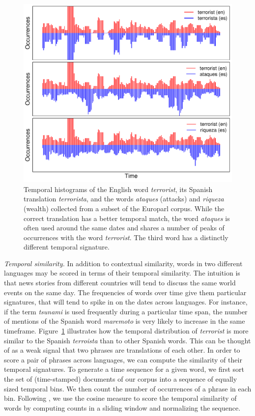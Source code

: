 \documentclass[11pt]{article}
\newcommand{\figref}[1]{Figure~\ref{#1}}
\newcommand{\paraheader}[1]{\vskip 0.08in \noindent\emph{#1}}
\begin{document}
\begin{figure}[t]
\includegraphics[width= \linewidth]{../figures/temporal/temporal}
\caption{Temporal histograms of the English word {\em terrorist}, its Spanish translation {\em terrorista}, and the words {\em ataques}  (attacks) and {\em riqueza} (wealth) collected from a subset of the Europarl corpus. While the correct translation has a better temporal match, the word {\em ataques} is often used around the same dates and shares a number of peaks of occurrences with the word {\em terrorist}.  The third word has a distinctly different temporal signature.}
\label{fig:temporal}
\end{figure}

\paraheader{Temporal similarity.} In addition to contextual similarity, words in two different languages may be scored in terms of their temporal similarity.  The intuition is that news stories from different countries will tend to discuss the same world events on the same day.  The frequencies of words over time give them particular signatures, that will tend to spike in on the dates across languages.  For instance, if the term {\it tsunami} is used frequently during a particular time span, the number of mentions of the Spanish word {\it maremoto} is very likely to increase in the same timeframe.     \figref{fig:temporal} illustrates how the temporal distribution of {\it terrorist} is more similar to the Spanish {\it terroista} than to other Spanish words.  This can be thought of as a weak signal that two phrases are translations of each other.  In order to score a pair of phrases across languages, we can compute the similarity of their temporal signatures. To generate a time sequence for a given word, we first sort the set of (time-stamped) documents of our corpus into a sequence of equally sized temporal bins.  We then count the number of occurrences of a phrase in each bin.  Following , we use the cosine measure to score the temporal similarity of words by computing counts in a sliding window and normalizing the sequence. 
\end{document}
